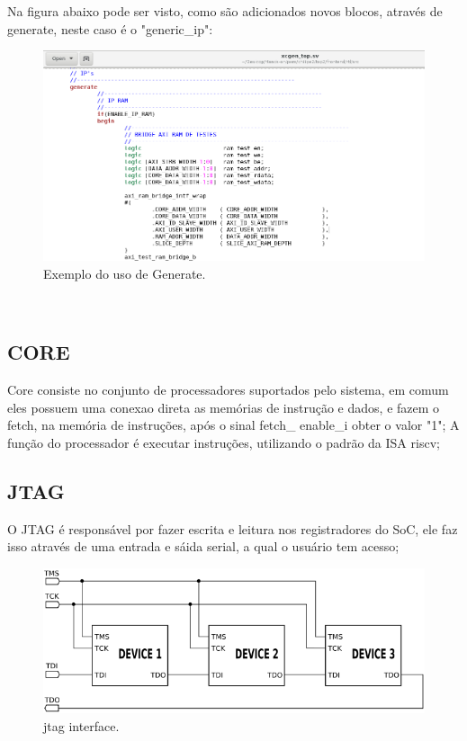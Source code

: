 Na figura abaixo pode ser visto, como são adicionados novos blocos, através de generate, neste caso é o "generic\_ip":
\begin{figure}[!htb]
  \includegraphics[width=\linewidth]{diagrams/ex_generate.png}
  \caption{Exemplo do uso de Generate.}
  \label{fig:top}
\end{figure}
\\
\subsection{CORE}
Core consiste no conjunto de processadores suportados pelo sistema, em comum eles possuem uma conexao direta as memórias de instrução e dados, e fazem o fetch, na memória de instruções, após o sinal fetch\_ enable\_i obter o valor "1";
A função do processador é executar instruções, utilizando o padrão da ISA risc\-v;

\subsection{JTAG}
O JTAG é responsável por fazer escrita e leitura nos registradores do SoC, ele faz isso através de uma entrada  e sáida serial, a qual o usuário tem acesso;
\begin{figure}[H]
  \includegraphics[width=\linewidth]{diagrams/jtag.png}
  \caption{jtag interface.}
  \label{fig:top}
\end{figure}

